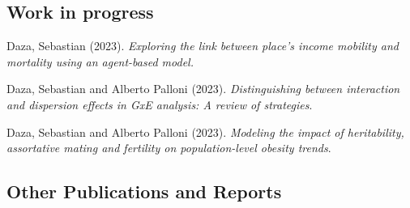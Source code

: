 \documentclass[10pt,letterpaper]{article}
\renewenvironment{itemize}{
  \begin{list}{}{
    \setlength{\leftmargin}{1.5em}
    \setlength{\itemsep}{0.25em}
    \setlength{\parskip}{0pt}
    \setlength{\parsep}{0.25em}
  }
}{
  \end{list}
}
\begin{document}
\subsection*{Work in progress}

\begin{itemize}

\item Daza, Sebastian (2023). {\textit{Exploring the link between place's income mobility and mortality using an agent-based model.}}
\item Daza, Sebastian and Alberto Palloni (2023). {\textit{Distinguishing between interaction and dispersion effects in GxE analysis: A review of strategies}.}
\item Daza, Sebastian and Alberto Palloni (2023). {\textit{Modeling the impact of heritability, assortative mating and fertility on population-level obesity trends}.}



\end{itemize}

\subsection*{Other Publications and Reports}
\end{document}
